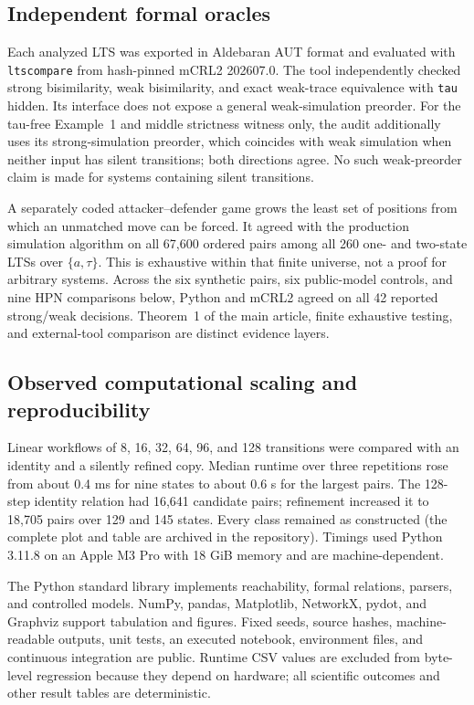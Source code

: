 \documentclass{ws-jbcb}
\numberwithin{equation}{section}
\newcommand{\TAU}{\tau}
\begin{document}
\subsection{Independent formal oracles}\label{sec:mcrl2-method}

Each analyzed LTS was exported in Aldebaran AUT format and evaluated with
\texttt{ltscompare} from hash-pinned mCRL2 202607.0.\cite{Bunte2019} The tool
independently checked strong bisimilarity, weak bisimilarity, and exact weak-trace
equivalence with \texttt{tau} hidden. Its interface does not expose a general weak-simulation preorder. For
the tau-free Example~1 and middle strictness witness only, the audit additionally
uses its strong-simulation preorder, which coincides with weak simulation
when neither input has silent transitions; both directions agree. No such
weak-preorder claim is made for systems containing silent transitions.

A separately coded attacker--defender game grows the least set of positions from
which an unmatched move can be forced. It agreed with the production simulation
algorithm on all 67,600 ordered pairs among all 260 one- and two-state LTSs over
$\{a,\TAU\}$. This is exhaustive within that finite universe, not a proof for
arbitrary systems. Across the six synthetic pairs, six public-model controls,
and nine HPN comparisons below, Python and mCRL2 agreed on all 42 reported
strong/weak decisions. Theorem~1 of the main article, finite exhaustive testing,
and external-tool comparison are distinct evidence layers.

\subsection{Observed computational scaling and reproducibility}
\label{sec:scalability-method}

Linear workflows of 8, 16, 32, 64, 96, and 128 transitions were compared with an
identity and a silently refined copy. Median runtime over three repetitions rose
from about 0.4 ms for nine states to about 0.6 s for the largest pairs. The
128-step identity relation had 16,641 candidate pairs; refinement increased it
to 18,705 pairs over 129 and 145 states. Every class remained as constructed
(the complete plot and table are archived in the repository). Timings used
Python 3.11.8 on an Apple M3 Pro with 18 GiB memory and are machine-dependent.

The Python standard library implements reachability, formal relations, parsers,
and controlled models. NumPy, pandas, Matplotlib, NetworkX, pydot, and Graphviz
support tabulation and figures. Fixed seeds, source hashes,
machine-readable outputs, unit tests, an executed notebook, environment files,
and continuous integration are public. Runtime CSV values are excluded from
byte-level regression because they depend on hardware; all scientific outcomes
and other result tables are deterministic.
\end{document}
